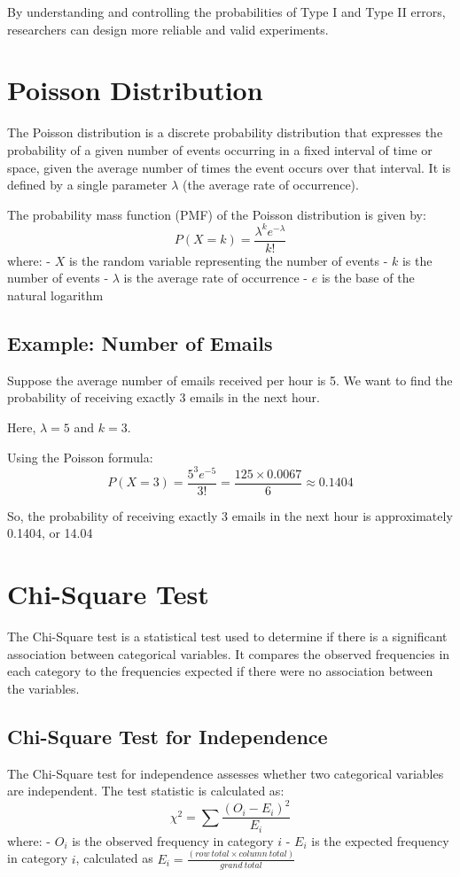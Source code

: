 \documentclass{article}
\begin{document}
By understanding and controlling the probabilities of Type I and Type II errors, researchers can design more reliable and valid experiments.

\section{Poisson Distribution}
The Poisson distribution is a discrete probability distribution that expresses the probability of a given number of events occurring in a fixed interval of time or space, given the average number of times the event occurs over that interval. It is defined by a single parameter \(\lambda\) (the average rate of occurrence).

The probability mass function (PMF) of the Poisson distribution is given by:
\[
P(X = k) = \frac{\lambda^k e^{-\lambda}}{k!}
\]
where:
- \(X\) is the random variable representing the number of events
- \(k\) is the number of events
- \(\lambda\) is the average rate of occurrence
- \(e\) is the base of the natural logarithm

\subsection{Example: Number of Emails}
Suppose the average number of emails received per hour is 5. We want to find the probability of receiving exactly 3 emails in the next hour.

Here, \(\lambda = 5\) and \(k = 3\).

Using the Poisson formula:
\[
P(X = 3) = \frac{5^3 e^{-5}}{3!} = \frac{125 \times 0.0067}{6} \approx 0.1404
\]

So, the probability of receiving exactly 3 emails in the next hour is approximately 0.1404, or 14.04%

\section{Chi-Square Test}
The Chi-Square test is a statistical test used to determine if there is a significant association between categorical variables. It compares the observed frequencies in each category to the frequencies expected if there were no association between the variables.

\subsection{Chi-Square Test for Independence}
The Chi-Square test for independence assesses whether two categorical variables are independent. The test statistic is calculated as:
\[
\chi^2 = \sum \frac{(O_i - E_i)^2}{E_i}
\]
where:
- \(O_i\) is the observed frequency in category \(i\)
- \(E_i\) is the expected frequency in category \(i\), calculated as \(E_i = \frac{(row\ total \times column\ total)}{grand\ total}\)
\end{document}
